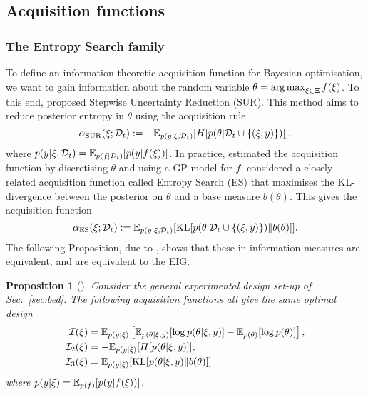 \documentclass[a4paper, 10pt]{report}
\theoremstyle{plain}
\newtheorem{proposition}[theorem]{Proposition}
\begin{document}
	
	
	
	\subsection{Acquisition functions}
	
	\subsubsection{The Entropy Search family}
	To define an information-theoretic acquisition function for Bayesian optimisation, we want to gain information about the random variable $\theta = \operatorname*{arg\,max}_{\xi\in\Xi} f(\xi)$.
	To this end, \citet{villemonteix2009informational} proposed Stepwise Uncertainty Reduction (SUR).
	This method aims to reduce posterior entropy in $\theta$ using the acquisition rule
	\begin{equation}
	\alpha_\text{SUR}(\xi;\mathcal{D}_t) := -\mathbb{E}_{p(y|\xi,\mathcal{D}_t)}[H[p(\theta|\mathcal{D}_t \cup \{(\xi,y)\})]].
	\end{equation}
	where $p(y|\xi,\mathcal{D}_t) = \mathbb{E}_{p(f|\mathcal{D}_t)}[p(y|f(\xi))]$.
	In practice, \citet{villemonteix2009informational} estimated the acquisition function by discretising $\theta$ and using a GP model for $f$.
	\citet{hennig2012entropy} considered a closely related acquisition function called Entropy Search (ES) that maximises the KL-divergence between the posterior on $\theta$ and a base measure $b(\theta)$.
	This gives the acquisition function
	\begin{equation}
	\alpha_\text{ES}(\xi;\mathcal{D}_t) := \mathbb{E}_{p(y|\xi,\mathcal{D}_t)}[\text{KL}[p(\theta|\mathcal{D}_t \cup \{(\xi,y)\}) \| b(\theta)]].
	\end{equation}
	The following Proposition, due to \citet{mackay1992information}, shows that these in information measures are equivalent, and are equivalent to the EIG.
	\begin{proposition}[\citet{mackay1992information}]
		Consider the general experimental design set-up of Sec.~\ref{sec:bed}. The following acquisition functions all give the same optimal design
		\begin{align}
		\mathcal{I}(\xi) &= \mathbb{E}_{p(y|\xi)}\left[ \mathbb{E}_{p(\theta|\xi,y)}[\log p(\theta|\xi,y)]-\mathbb{E}_{p(\theta)}[\log p(\theta)] \right], \\
		\mathcal{I}_2(\xi) &= -\mathbb{E}_{p(y|\xi)}[H[p(\theta|\xi,y)]], \\
		\mathcal{I}_3(\xi) &= \mathbb{E}_{p(y|\xi)}[\textup{KL}[p(\theta|\xi,y) \| b(\theta)]]
		\end{align}
		where $p(y|\xi) = \mathbb{E}_{p(f)}[p(y|f(\xi))]$.
	\end{proposition}
\end{document}
